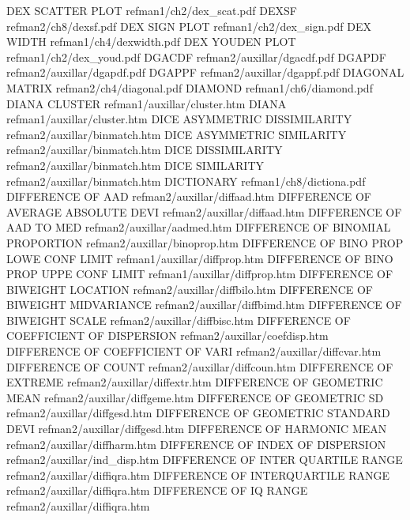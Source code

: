 DEX SCATTER PLOT                        refman1/ch2/dex_scat.pdf
DEXSF                                   refman2/ch8/dexsf.pdf
DEX SIGN PLOT                           refman1/ch2/dex_sign.pdf
DEX WIDTH                               refman1/ch4/dexwidth.pdf
DEX YOUDEN PLOT                         refman1/ch2/dex_youd.pdf
DGACDF                                  refman2/auxillar/dgacdf.pdf
DGAPDF                                  refman2/auxillar/dgapdf.pdf
DGAPPF                                  refman2/auxillar/dgappf.pdf
DIAGONAL MATRIX                         refman2/ch4/diagonal.pdf
DIAMOND                                 refman1/ch6/diamond.pdf
DIANA CLUSTER                           refman1/auxillar/cluster.htm
DIANA                                   refman1/auxillar/cluster.htm
DICE ASYMMETRIC DISSIMILARITY           refman2/auxillar/binmatch.htm
DICE ASYMMETRIC SIMILARITY              refman2/auxillar/binmatch.htm
DICE DISSIMILARITY                      refman2/auxillar/binmatch.htm
DICE SIMILARITY                         refman2/auxillar/binmatch.htm
DICTIONARY                              refman1/ch8/dictiona.pdf
DIFFERENCE OF AAD                       refman2/auxillar/diffaad.htm
DIFFERENCE OF AVERAGE ABSOLUTE DEVI     refman2/auxillar/diffaad.htm
DIFFERENCE OF AAD TO MED                refman2/auxillar/aadmed.htm
DIFFERENCE OF BINOMIAL PROPORTION       refman2/auxillar/binoprop.htm
DIFFERENCE OF BINO PROP LOWE CONF LIMIT refman1/auxillar/diffprop.htm
DIFFERENCE OF BINO PROP UPPE CONF LIMIT refman1/auxillar/diffprop.htm
DIFFERENCE OF BIWEIGHT LOCATION         refman2/auxillar/diffbilo.htm
DIFFERENCE OF BIWEIGHT MIDVARIANCE      refman2/auxillar/diffbimd.htm
DIFFERENCE OF BIWEIGHT SCALE            refman2/auxillar/diffbisc.htm
DIFFERENCE OF COEFFICIENT OF DISPERSION refman2/auxillar/coefdisp.htm
DIFFERENCE OF COEFFICIENT OF VARI       refman2/auxillar/diffcvar.htm
DIFFERENCE OF COUNT                     refman2/auxillar/diffcoun.htm
DIFFERENCE OF EXTREME                   refman2/auxillar/diffextr.htm
DIFFERENCE OF GEOMETRIC MEAN            refman2/auxillar/diffgeme.htm
DIFFERENCE OF GEOMETRIC SD              refman2/auxillar/diffgesd.htm
DIFFERENCE OF GEOMETRIC STANDARD DEVI   refman2/auxillar/diffgesd.htm
DIFFERENCE OF HARMONIC MEAN             refman2/auxillar/diffharm.htm
DIFFERENCE OF INDEX OF DISPERSION       refman2/auxillar/ind_disp.htm
DIFFERENCE OF INTER QUARTILE RANGE      refman2/auxillar/diffiqra.htm
DIFFERENCE OF INTERQUARTILE RANGE       refman2/auxillar/diffiqra.htm
DIFFERENCE OF IQ RANGE                  refman2/auxillar/diffiqra.htm
